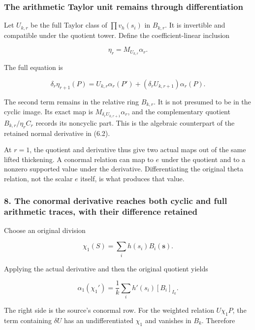 \subsubsection{The arithmetic Taylor unit remains through
differentiation}\label{cyclic_sum:the-arithmetic-taylor-unit-remains-through-differentiation}

Let \(U_{k,r}\) be the full Taylor class of \(\prod v_h(s_i)\) in
\(B_{k,r}\). It is invertible and compatible under the quotient tower.
Define the coefficient-linear inclusion

\[\eta_r=M_{U_{k,r}}\alpha_r.\]

The full equation is

\[\boxed{\delta_r\eta_{r+1}(P)
=U_{k,r}\alpha_r(P')+(\delta_rU_{k,r+1})\alpha_r(P).}\tag{7.11}\]

The second term remains in the relative ring \(B_{k,r}\). It is not
presumed to be in the cyclic image. Its exact map is
\(M_{\delta_rU_{k,r+1}}\alpha_r\), and the complementary quotient
\(B_{k,r}/\eta_rC_r\) records its noncyclic part. This is the algebraic
counterpart of the retained normal derivative in (6.2).

At \(r=1\), the quotient and derivative thus give two actual maps out of
the same lifted thickening. A conormal relation can map to \(e\) under
the quotient and to a nonzero supported value under the derivative.
Differentiating the original theta relation, not the scalar \(e\)
itself, is what produces that value.

\subsubsection{8. The conormal derivative reaches both cyclic and full
arithmetic traces, with their difference
retained}\label{cyclic_sum:the-conormal-derivative-reaches-both-cyclic-and-full-arithmetic-traces-with-their-difference-retained}

Choose an original division

\[\chi_1(S)=\sum_i h(s_i)B_i(\mathbf s).\]

Applying the actual derivative and then the original quotient yields

\[\boxed{\alpha_1(\chi_1')
=\frac1k\sum_i h'(s_i)[B_i]_{I_k}.}\tag{8.1}\]

The right side is the source's conormal row. For the weighted relation
\(U\chi_1P\), the term containing \(\delta U\) has an undifferentiated
\(\chi_1\) and vanishes in \(B_k\). Therefore

